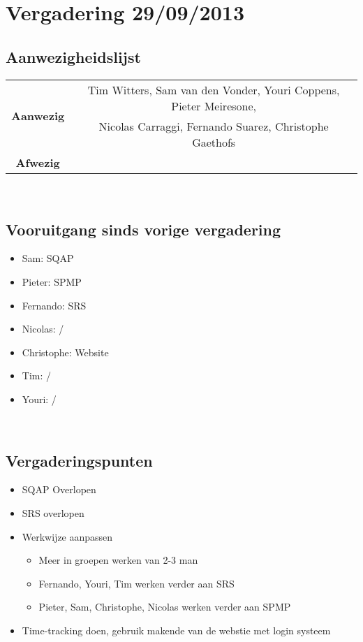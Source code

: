 \section{Vergadering 29/09/2013}
\subsection{Aanwezigheidslijst}
\begin{table}[htbp]
	\centering
	\begin{tabular}{c|c}
		\multirow{2}{*}{\textbf{Aanwezig}} & Tim Witters, Sam van den Vonder, Youri Coppens, Pieter Meiresone, \\
		& Nicolas Carraggi,  Fernando Suarez, Christophe Gaethofs \\
		\hline
		\textbf{Afwezig} &  \\
	\end{tabular}
\end{table}
\mbox{} 
\\

\subsection{Vooruitgang sinds vorige vergadering}
\begin{itemize}
	\item Sam: SQAP
	\item Pieter: SPMP
	\item Fernando: SRS
	\item Nicolas: /
	\item Christophe: Website
	\item Tim: /
	\item Youri: /
\end{itemize}
\mbox{} 
\\
\subsection{Vergaderingspunten}
\begin{itemize}
	\item SQAP Overlopen
	\item SRS overlopen
	\item Werkwijze aanpassen
	\begin{itemize}
		\item Meer in groepen werken van 2-3 man
		\item Fernando, Youri, Tim werken verder aan SRS
		\item Pieter, Sam, Christophe, Nicolas werken verder aan SPMP
	\end{itemize}
	\item Time-tracking doen, gebruik makende van de webstie met login systeem
\end{itemize}

